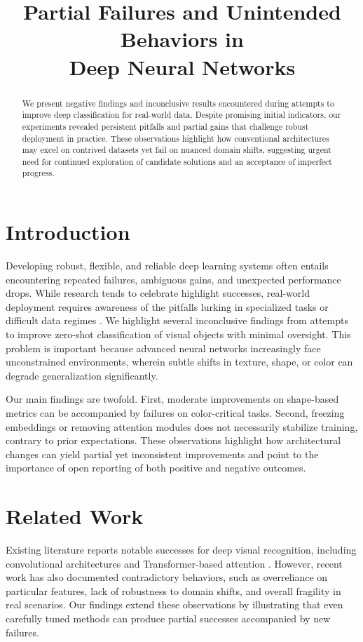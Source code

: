 \documentclass[11pt]{article}
\begin{document}
\title{Partial Failures and Unintended Behaviors in \\ Deep Neural Networks}
\date{}
\maketitle

\begin{abstract}
We present negative findings and inconclusive results encountered during attempts to improve deep classification for real-world data. Despite promising initial indicators, our experiments revealed persistent pitfalls and partial gains that challenge robust deployment in practice. These observations highlight how conventional architectures may excel on contrived datasets yet fail on nuanced domain shifts, suggesting urgent need for continued exploration of candidate solutions and an acceptance of imperfect progress.
\end{abstract}

\section{Introduction}
Developing robust, flexible, and reliable deep learning systems often entails encountering repeated failures, ambiguous gains, and unexpected performance drops. While research tends to celebrate highlight successes, real-world deployment requires awareness of the pitfalls lurking in specialized tasks or difficult data regimes \cite{dummy1}. We highlight several inconclusive findings from attempts to improve zero-shot classification of visual objects with minimal oversight. This problem is important because advanced neural networks increasingly face unconstrained environments, wherein subtle shifts in texture, shape, or color can degrade generalization significantly.

Our main findings are twofold. First, moderate improvements on shape-based metrics can be accompanied by failures on color-critical tasks. Second, freezing embeddings or removing attention modules does not necessarily stabilize training, contrary to prior expectations. These observations highlight how architectural changes can yield partial yet inconsistent improvements and point to the importance of open reporting of both positive and negative outcomes.

\section{Related Work}
Existing literature reports notable successes for deep visual recognition, including convolutional architectures and Transformer-based attention \cite{dummy2}. However, recent work has also documented contradictory behaviors, such as overreliance on particular features, lack of robustness to domain shifts, and overall fragility in real scenarios. Our findings extend these observations by illustrating that even carefully tuned methods can produce partial successes accompanied by new failures.
\end{document}
